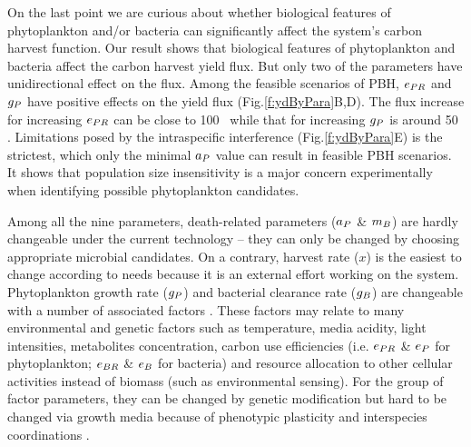 \documentclass[../thesis.tex]{subfiles} %
\begin{document}
On the last point we are curious about whether biological features of phytoplankton and/or bacteria can significantly affect the system’s carbon harvest function.  Our result shows that biological features of phytoplankton and bacteria affect the carbon harvest yield flux.  But only two of the parameters have unidirectional effect on the flux.  Among the feasible scenarios of PBH, $e_{PR}$ and $g_P$ have positive effects on the yield flux (Fig.\ref{f:ydByPara}B,D).  The flux increase for increasing $e_{PR}$ can be close to 100 \dxdt\ while that for increasing $g_P$ is around 50 \dxdt.  Limitations posed by the intraspecific interference (Fig.\ref{f:ydByPara}E) is the strictest, which only the minimal $a_P$ value can result in feasible PBH scenarios.  It shows that population size insensitivity is a major concern experimentally when identifying possible phytoplankton candidates.

Among all the nine parameters, death-related parameters ($a_P$ \& $m_B$) are hardly changeable under the current technology -- they can only be changed by choosing appropriate microbial candidates.  On a contrary, harvest rate ($x$) is the easiest to change according to needs because it is an external effort working on the system.  Phytoplankton growth rate ($g_P$) and bacterial clearance rate ($g_B$) are changeable with a number of associated factors \autocite{park2020potential}.  These factors may relate to many environmental and genetic factors such as temperature, media acidity, light intensities, metabolites concentration, carbon use efficiencies (i.e. $e_{PR}$ \& $e_P$ for phytoplankton; $e_{BR}$ \& $e_B$ for bacteria) and resource allocation to other cellular activities instead of biomass (such as environmental sensing).  For the group of factor parameters, they can be changed by genetic modification \autocite{moniruzzaman1996ethanol} but hard to be changed via growth media because of phenotypic plasticity \autocite{j1989respiration,bratbak1985phytoplankton,samejima1958heterotrophic} and interspecies coordinations \autocite{beliaev2014inference,amin2012interactions}.
\end{document}
